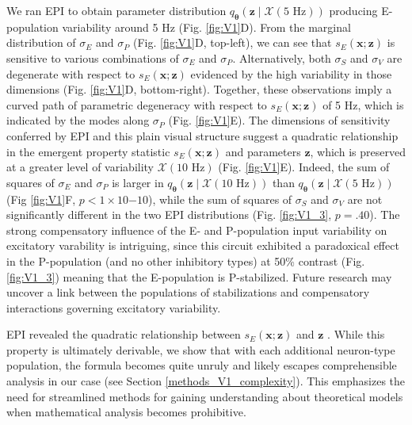 \documentclass[11pt]{article}
\begin{document}
We ran EPI to obtain parameter distribution $q_{\bm{\theta}}(\mathbf{z} \mid \mathcal{X}(5\text{ Hz}))$ producing E-population variability around 5 Hz (Fig. \ref{fig:V1}D).
From the marginal distribution of $\sigma_E$ and $\sigma_P$ (Fig. \ref{fig:V1}D, top-left), we can see that $s_E(\mathbf{x}; \mathbf{z})$ is sensitive to various combinations of $\sigma_E$ and $\sigma_P$.
Alternatively, both $\sigma_S$ and $\sigma_V$ are degenerate with respect to $s_E(\mathbf{x}; \mathbf{z})$ evidenced by the high variability in those dimensions (Fig. \ref{fig:V1}D, bottom-right).
Together, these observations imply a curved path of parametric degeneracy with respect to $s_E(\mathbf{x}; \mathbf{z})$ of 5 Hz, which is indicated by the modes along $\sigma_P$ (Fig. \ref{fig:V1}E).
The dimensions of sensitivity conferred by EPI and this plain visual structure suggest a quadratic relationship in the emergent property statistic $s_E(\mathbf{x}; \mathbf{z})$ and parameters $\mathbf{z}$, which is preserved at a greater level of variability $\mathcal{X}(10\text{ Hz})$ (Fig. \ref{fig:V1}E).
Indeed, the sum of squares of $\sigma_E$ and $\sigma_P$ is larger in $q_{\bm{\theta}}(\mathbf{z} \mid \mathcal{X}(10\text{ Hz}))$ than $q_{\bm{\theta}}(\mathbf{z} \mid \mathcal{X}(5\text{ Hz}))$ (Fig \ref{fig:V1}F, $p < 1 \times 10{-10}$), while the sum of squares of $\sigma_S$ and $\sigma_V$ are not significantly different in the two EPI distributions (Fig. \ref{fig:V1_3}, $p=.40$).
The strong compensatory influence of the E- and P-population input variability on excitatory varability is intriguing, since this circuit exhibited a paradoxical effect in the P-population (and no other inhibitory types) at 50\% contrast (Fig. \ref{fig:V1_3}) meaning that the E-population is P-stabilized.
Future research may uncover a link between the populations of stabilizations and compensatory interactions governing excitatory variability.

EPI revealed the quadratic relationship between $s_E(\mathbf{x}; \mathbf{z})$ and $\mathbf{z}$ .
While this property is ultimately derivable, we show that with each additional neuron-type population, the formula becomes quite unruly and likely escapes comprehensible analysis in our case (see Section \ref{methods_V1_complexity}).
This emphasizes the need for streamlined methods for gaining understanding about theoretical models when mathematical analysis becomes prohibitive.


\end{document}
